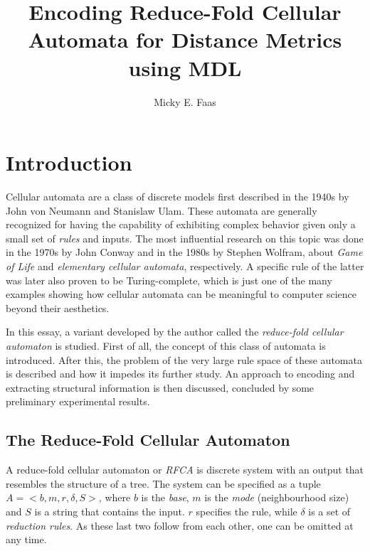 \documentclass{llncs}
\begin{document}
\title{Encoding Reduce-Fold Cellular Automata for Distance Metrics using MDL}
\author{Micky E. Faas}
\maketitle

\bigskip

\section{Introduction}
Cellular automata are a class of discrete models first described in the 1940s by John von Neumann and Stanislaw Ulam\cite{neumann}. These automata are generally recognized for having the capability of exhibiting complex behavior given only a small set of \emph{rules} and inputs. The most influential research on this topic was done in the 1970s by John Conway and in the 1980s by Stephen Wolfram, about \emph{Game of Life}\cite{life} and \emph{elementary cellular automata}\cite{elemca}, respectively. A specific rule of the latter was later also proven\cite{cook} to be Turing-complete, which is just one of the many examples showing how cellular automata can be meaningful to computer science beyond their aesthetics.

In this essay, a variant developed by the author called the \emph{reduce-fold cellular automaton} is studied. First of all, the concept of this class of automata is introduced. After this, the problem of the very large rule space of these automata is described and how it impedes its further study. An approach to encoding and extracting structural information is then discussed, concluded by some preliminary experimental results.

\subsection{The Reduce-Fold Cellular Automaton}
A reduce-fold cellular automaton or \emph{RFCA} is discrete system with an output that resembles the structure of a tree. The system can be specified as a tuple $A=<b,m,r,\delta,S>$, where $b$ is the \emph{base}, $m$ is the \emph{mode} (neighbourhood size) and $S$ is a string that contains the input. $r$ specifies the {rule}, while $\delta$ is a set of \emph{reduction rules}. As these last two follow from each other, one can be omitted at any time.
\end{document}
